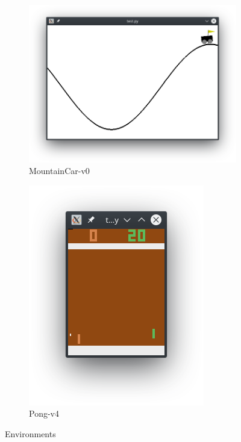 \documentclass[12pt,a4paper]{article}
\begin{document}
\begin{figure}[H]
    \centering
    \begin{subfigure}[a]{0.4\textwidth}
        \includegraphics[width=\textwidth]{MountainCar-Victory}
        \caption{MountainCar-v0}
    \end{subfigure}
    \begin{subfigure}[a]{0.4\textwidth}
        \includegraphics[width=\textwidth]{Pong-Victory}
        \caption{Pong-v4}
    \end{subfigure}
    \caption{Environments}
\end{figure}
\end{document}

